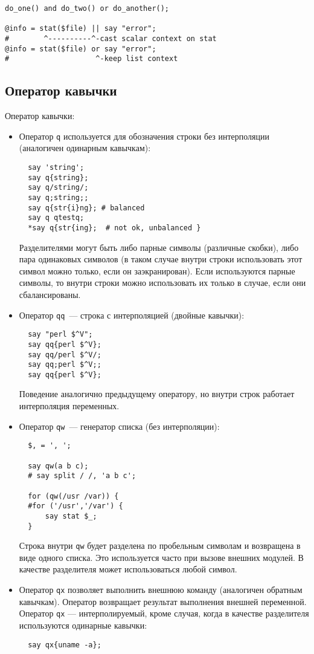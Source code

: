 \begin{verbatim}
do_one() and do_two() or do_another();

@info = stat($file) || say "error";
#        ^----------^-cast scalar context on stat
@info = stat($file) or say "error";
#                    ^-keep list context
\end{verbatim}

\subsection{Оператор кавычки}
Оператор кавычки:
\begin{itemize}
  \item Оператор \verb|q| используется для обозначения строки без интерполяции (аналогичен одинарным кавычкам):
  \begin{verbatim}
  say 'string';
  say q{string};
  say q/string/;
  say q;string;;
  say q{str{i}ng}; # balanced
  say q qtestq;
  *say q{str{ing};  # not ok, unbalanced }
  \end{verbatim}
  Разделителями могут быть либо парные символы (различные скобки), либо пара одинаковых символов (в таком случае внутри строки использовать этот символ можно только, если он заэкранирован). Если используются парные символы, то внутри строки можно использовать их только в случае, если они сбалансированы.

  \item Оператор \verb|qq|~--- строка с интерполяцией (двойные кавычки):
  \begin{verbatim}
  say "perl $^V";
  say qq{perl $^V};
  say qq/perl $^V/;
  say qq;perl $^V;;
  say qq{perl $^V};
  \end{verbatim}
  Поведение аналогично предыдущему оператору, но внутри строк работает интерполяция переменных.

  \item Оператор \verb|qw|~--- генератор списка (без интерполяции):
  \begin{verbatim}
  $, = ', ';

  say qw(a b c);
  # say split / /, 'a b c';

  for (qw(/usr /var)) {
  #for ('/usr','/var') {
      say stat $_;
  }
  \end{verbatim}
  Строка внутри \verb|qw| будет разделена по пробельным символам и возвращена в виде одного списка.  Это используется часто при вызове внешних модулей. В качестве разделителя может использоваться любой символ.

  \item Оператор \verb|qx| позволяет выполнить внешнюю команду (аналогичен обратным кавычкам). Оператор возвращает результат выполнения внешней переменной. Оператор \verb|qx| --- интерполируемый, кроме случая, когда в качестве разделителя используются одинарные кавычки:
  \begin{verbatim}
  say qx{uname -a};


\end{verbatim}
\end{itemize}
